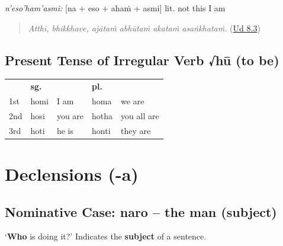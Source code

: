 \documentclass[11pt,oneside]{memoir}
\begin{document}
\bigskip

\emph{n'eso'ham'asmi:} {[}na + eso + ahaṁ + asmi] lit. not this I am

\begin{quote}
\emph{Atthi, bhikkhave, ajātaṁ abhūtaṁ akataṁ asaṅkhataṁ.} (\href{https://suttacentral.net/ud8.3/pli/ms}{Ud 8.3})

\end{quote}
\subsection{Present Tense of Irregular Verb √hū (to be)}
\label{sec:orga333871}

\begin{center}
\begin{tabular}{lllll}
 & \textbf{sg.} &  & \textbf{pl.} & \\
1st & homi & I am & homa & we are\\
2nd & hosi & you are & hotha & you all are\\
3rd & hoti & he is & honti & they are\\
\end{tabular}
\end{center}
\section{Declensions (-a)}
\label{sec:org940c53b}
\subsection{Nominative Case: naro -- the man (subject)}
\label{sec:org47d67be}

`\textbf{Who} is doing it?' Indicates the \textbf{subject} of a sentence.

\bigskip
\end{document}
